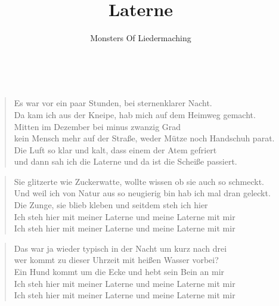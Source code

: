 \documentclass[9pt,a4paper,oneside, onecolumn]{article}
\author{Monsters Of Liedermaching}
\title{Laterne}
\date{}
\begin{document}
\maketitle
\thispagestyle{empty}

\mbox{
}\\

\begin{verse}
Es war vor ein paar Stunden, bei sternenklarer Nacht.\\
Da kam ich aus der Kneipe, hab mich auf dem Heimweg gemacht.\\
Mitten im Dezember bei minus zwanzig Grad\\
kein Mensch mehr auf der Straße, weder Mütze noch Handschuh parat.\\
Die Luft so klar und kalt, dass einem der Atem gefriert\\
und dann sah ich die Laterne und da ist die Scheiße passiert.\\
\end{verse}

\begin{verse}
Sie glitzerte wie Zuckerwatte, wollte wissen ob sie auch so schmeckt.\\
Und weil ich von Natur aus so neugierig bin hab ich mal dran geleckt.\\
Die Zunge, sie blieb kleben und seitdem steh ich hier\\
Ich steh hier mit meiner Laterne und meine Laterne mit mir\\
Ich steh hier mit meiner Laterne und meine Laterne mit mir\\
\end{verse}


\begin{verse}
Das war ja wieder typisch in der Nacht um kurz nach drei\\
wer kommt zu dieser Uhrzeit mit heißen Wasser vorbei?\\
Ein Hund kommt um die Ecke und hebt sein Bein an mir\\
Ich steh hier mit meiner Laterne und meine Laterne mit mir\\
Ich steh hier mit meiner Laterne und meine Laterne mit mir\\
\end{verse}
\end{document}
